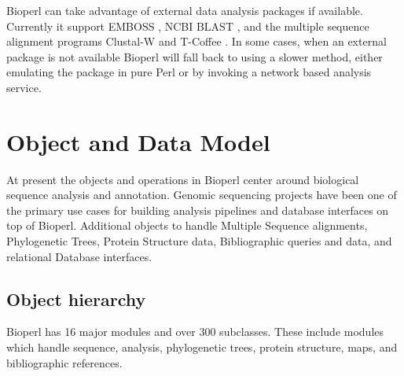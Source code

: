 \documentclass[12pt]{article}
\begin{document}
Bioperl can take advantage of external data analysis packages if
available.  Currently it support EMBOSS \cite{emboss}, NCBI BLAST
\cite{blast}, and the multiple sequence alignment programs Clustal-W
\cite{clustalw} and T-Coffee \cite{tcoffee}.  In some cases, when an
external package is not available Bioperl will fall back to using a
slower method, either emulating the package in pure Perl or by
invoking a network based analysis service.

\section{Object and Data Model}

At present the objects and operations in Bioperl center around
biological sequence analysis and annotation.  Genomic sequencing
projects have been one of the primary use cases for building analysis
pipelines and database interfaces on top of Bioperl.   Additional
objects to handle Multiple Sequence alignments, Phylogenetic Trees,
Protein Structure data, Bibliographic queries and data, and relational
Database interfaces.

\subsection{Object hierarchy}

Bioperl has 16 major modules and over 300 subclasses.  These include
modules which handle sequence, analysis, phylogenetic trees, protein
structure, maps, and bibliographic references.  
\end{document}
